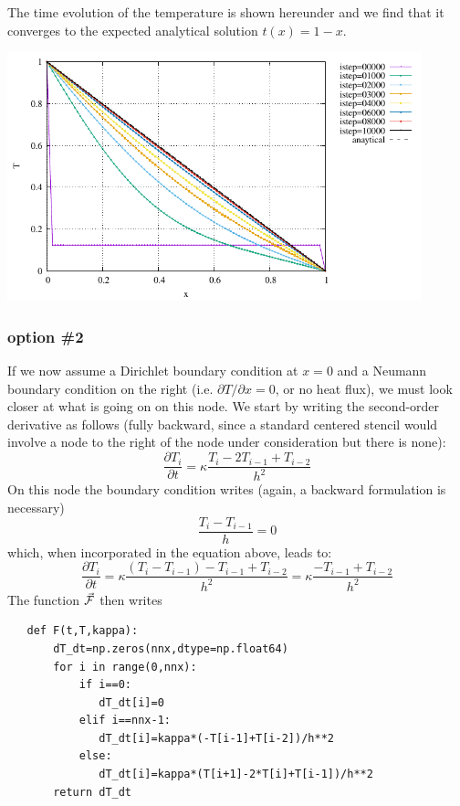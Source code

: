 The time evolution of the temperature is shown hereunder and we find that 
it converges to the expected analytical solution $t(x)=1-x$.

\begin{center}
\includegraphics[width=12cm]{python_codes/fieldstone_157/results/option1/T.pdf}
\end{center}

\subsubsection*{option \#2}

If we now assume a Dirichlet boundary condition at $x=0$ and a Neumann boundary condition 
on the right (i.e. $\partial T/\partial x=0$, or no heat flux), we must look closer at what is going on 
on this node. 
We start by writing the second-order derivative as follows (fully backward, since
a standard centered stencil would involve a node to the right of the node 
under consideration but there is none):
\[
\frac{\partial T_i}{\partial t} = \kappa \frac{T_{i}-2T_{i-1}+T_{i-2}}{h^2}
\]
On this node the boundary condition writes (again, a backward formulation is necessary)
\[
\frac{T_i-T_{i-1}}{h}=0
\]
which, when incorporated in the equation above, leads to:
\[
\frac{\partial T_i}{\partial t} 
= \kappa \frac{(T_{i}-T_{i-1})-T_{i-1}+T_{i-2}}{h^2}
= \kappa \frac{-T_{i-1}+T_{i-2}}{h^2}
\]
The function $\vec{\cal F}$ then writes
\begin{lstlisting}
   def F(t,T,kappa):
       dT_dt=np.zeros(nnx,dtype=np.float64)
       for i in range(0,nnx):
           if i==0:
              dT_dt[i]=0
           elif i==nnx-1: 
              dT_dt[i]=kappa*(-T[i-1]+T[i-2])/h**2
           else:
              dT_dt[i]=kappa*(T[i+1]-2*T[i]+T[i-1])/h**2
       return dT_dt
\end{lstlisting}

